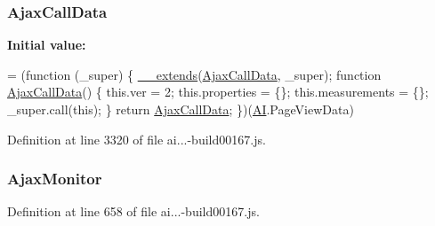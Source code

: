 \subsubsection[{\texorpdfstring{Ajax\+Call\+Data}{AjaxCallData}}]{ Ajax\+Call\+Data}\hypertarget{_scripts_2ai_80_822_89-build00167_8js_a85c6bfff3874043e13f9f194f56a9498}{}\label{_scripts_2ai_80_822_89-build00167_8js_a85c6bfff3874043e13f9f194f56a9498}
{\bfseries Initial value\+:}
\begin{DoxyCode}
= (\textcolor{keyword}{function} (\_super) \{
        \hyperlink{obj_2_release_2_package_2_package_tmp_2_scripts_2ai_80_822_89-build00167_8js_ac09f4951ac4b25df0272d4e78ff85ae0}{\_\_extends}(\hyperlink{obj_2_release_2_package_2_package_tmp_2_scripts_2ai_80_822_89-build00167_8js_a85c6bfff3874043e13f9f194f56a9498}{AjaxCallData}, \_super);
        \textcolor{keyword}{function} \hyperlink{obj_2_release_2_package_2_package_tmp_2_scripts_2ai_80_822_89-build00167_8js_a85c6bfff3874043e13f9f194f56a9498}{AjaxCallData}() \{
            this.ver = 2;
            this.properties = \{\};
            this.measurements = \{\};
            \_super.call(\textcolor{keyword}{this});
        \}
        \textcolor{keywordflow}{return} \hyperlink{obj_2_release_2_package_2_package_tmp_2_scripts_2ai_80_822_89-build00167_8js_a85c6bfff3874043e13f9f194f56a9498}{AjaxCallData};
    \})(\hyperlink{obj_2_release_2_package_2_package_tmp_2_scripts_2ai_80_822_89-build00167_8js_aa840f97564574b54956c385088b90e81}{AI}.PageViewData)
\end{DoxyCode}


Definition at line 3320 of file ai...-\/build00167.\+js.

\subsubsection[{\texorpdfstring{Ajax\+Monitor}{AjaxMonitor}}]{ Ajax\+Monitor}\hypertarget{_scripts_2ai_80_822_89-build00167_8js_a04e5b115a114a7180491d402b8c7e51b}{}\label{_scripts_2ai_80_822_89-build00167_8js_a04e5b115a114a7180491d402b8c7e51b}


Definition at line 658 of file ai...-\/build00167.\+js.

